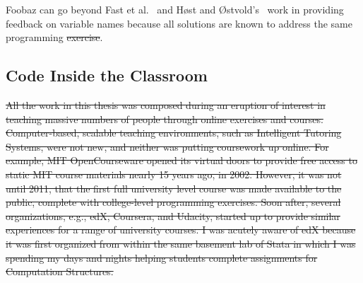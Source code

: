 \documentclass[12pt,twoside]{mitthesis}
\providecommand{\DIFaddtex}[1]{{\protect\color{blue}\uwave{#1}}} %
\providecommand{\DIFdeltex}[1]{{\protect\color{red}\sout{#1}}}                      %
\providecommand{\DIFaddbegin}{} %
\providecommand{\DIFaddend}{} %
\providecommand{\DIFdelbegin}{} %
\providecommand{\DIFdelend}{} %
\providecommand{\DIFadd}[1]{\texorpdfstring{\DIFaddtex{#1}}{#1}} %
\providecommand{\DIFdel}[1]{\texorpdfstring{\DIFdeltex{#1}}{}} %
\begin{document}
Foobaz can go beyond Fast et al.~\cite{codex} and H{{\o{}}}st and {{\O{}}}stvold's~\cite{host2008java,host2009debugging} work in providing feedback on variable names because all solutions are known to address the same programming \DIFdelbegin \DIFdel{exercise}\DIFdelend \DIFaddbegin \DIFadd{problem}\DIFaddend .

\DIFdelbegin %
\DIFdelend %
\DIFaddbegin \subsection{Code Inside the Classroom}
\DIFaddend 

\DIFdelbegin \DIFdel{All the work in this thesis was composed during an eruption of interest in teaching massive numbers of people through online exercises and courses. Computer-based, scalable teaching environments, such as Intelligent Tutoring Systems, were not new, and neither was putting coursework up online. For example, MIT OpenCourseware opened its virtual doors to provide free access to static MIT course materials nearly 15 years ago, in 2002. However, it was not until 2011, that the first full university level course was made available to the public, complete with college-level programming exercises. Soon after, several organizations, e.g., edX, Coursera, and Udacity, started up to provide similar experiences for a range of university courses. I was acutely aware of edX because it was first organized from within the same basement lab of Stata in which I was spending my days and nights helping students complete assignments for Computation Structures.
}%

\end{document}
